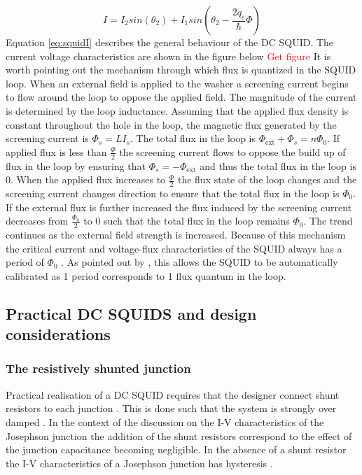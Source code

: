 \begin{equation}
    I = I_2sin(\theta_2) + I_1sin(\theta_2 - \frac{2q_e}{\hbar}\Phi)
    \label{eq:squidI}
\end{equation}
\noindent
Equation \ref{eq:squidI} describes the general behaviour of the DC SQUID. The current voltage characteristics are shown in the figure below \textcolor{red}{Get figure} \newline
It is worth pointing out the mechanism through which flux is quantized in the SQUID loop. When an external field is applied to the washer a screening current begins to flow around the loop to oppose the applied field. The magnitude of the current is determined by the loop inductance. Assuming that the applied flux density is constant throughout the hole in the loop, the magnetic flux generated by the screening current is $\Phi_s = LI_s$. The total flux in the loop is $\Phi_{\text{ext}} + \Phi_{s} = n\Phi_0$. If applied flux is less than $\frac{\Phi}{2}$ the screening current flows to oppose the build up of flux in the loop by ensuring that $\Phi_s = -\Phi_{\text{ext}}$ and thus the total flux in the loop is 0. When the applied flux increases to $\frac{\Phi}{2}$ the flux state of the loop changes and the screening current changes direction \cite{Drung2016NBSQUIDS} to ensure that the total flux in the loop is $\Phi_0$. If the external flux is further increased the flux induced by the screening current decreases from $\frac{\Phi_0}{2}$ to $0$ such that the total flux in the loop remains $\Phi_0$. The trend continues as the external field strength is increased. Because of this mechanism the critical current and voltage-flux characteristics of the SQUID always has a period of $\Phi_0$ \cite{SQUIDhandbook}. As pointed out by \cite{Drung2016NBSQUIDS}, this allows the SQUID to be automatically calibrated as 1 period corresponds to 1 flux quantum in the loop.

\subsection{Practical DC SQUIDS and design considerations}

\subsubsection*{The resistively shunted junction}
Practical realisation of a DC SQUID requires that the designer connect shunt resistors to each junction \cite{Drung2016NBSQUIDS}. This is done such that the system is strongly over damped \cite{SQUIDhandbook}. In the context of the discussion on the I-V characteristics  of the Josephson junction the addition of the shunt resistors correspond to the effect of the junction capacitance becoming negligible. In the absence of a shunt resistor the I-V characteristics of a Josephson junction has hysteresis \cite{Drung2016NBSQUIDS}. 

